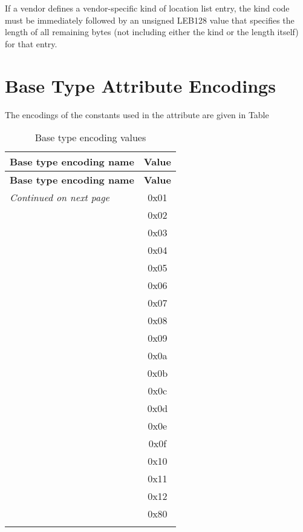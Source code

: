 \bb
If a vendor defines a vendor-specific kind of location 
list entry, the kind code must be immediately followed by an
unsigned LEB128 value that specifies the length of all
remaining bytes (not including either the kind or the length
itself) for that entry.
\eb

\section{Base Type Attribute Encodings}
\label{datarep:basetypeattributeencodings}

The\hypertarget{chap:DWATencodingencodingofbasetype}{}
encodings of the constants used in the 
\DWATencodingDEFN{} attribute 
are given in 
Table 

\begin{centering}
\setlength{\extrarowheight}{0.1cm}
\begin{longtable}{l|c}
  \caption{Base type encoding values} \label{tab:basetypeencodingvalues} \\
  \hline \bfseries Base type encoding name&\bfseries Value \\ \hline
\endfirsthead
  \bfseries Base type encoding name&\bfseries Value\\ \hline
\endhead
  \hline \emph{Continued on next page}
\endfoot
  \hline
\endlastfoot
\DWATEaddress			& 0x01 \\
\DWATEboolean			& 0x02 \\
\DWATEcomplexfloat		& 0x03 \\
\DWATEfloat				& 0x04 \\
\DWATEsigned			& 0x05 \\
\DWATEsignedchar		& 0x06 \\
\DWATEunsigned			& 0x07 \\
\DWATEunsignedchar		& 0x08 \\
\DWATEimaginaryfloat	& 0x09 \\
\DWATEpackeddecimal		& 0x0a \\
\DWATEnumericstring		& 0x0b \\
\DWATEedited			& 0x0c \\
\DWATEsignedfixed		& 0x0d \\
\DWATEunsignedfixed		& 0x0e \\
\DWATEdecimalfloat 		& 0x0f \\
\DWATEUTF{} 			& 0x10 \\
\DWATEUCS   			& 0x11 \\
\DWATEASCII 			& 0x12 \\
\DWATElouser{} 			& 0x80 \\
\DWATEhiuser{} 			& \xff \\
\end{longtable}
\end{centering}

